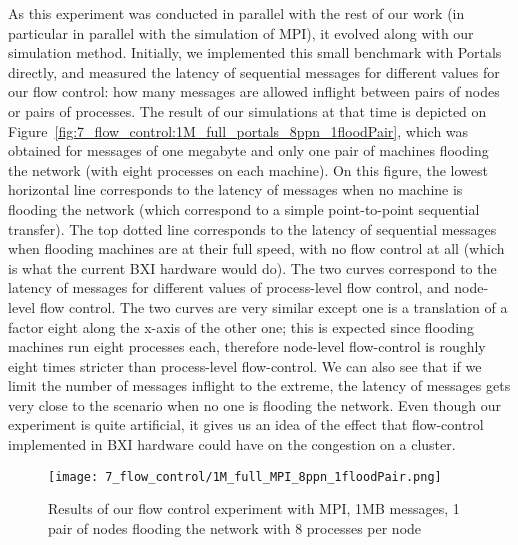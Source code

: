 As this experiment was conducted in parallel with the rest of our work (in
particular in parallel with the simulation of MPI), it evolved along with our
simulation method. Initially, we implemented this small benchmark with Portals
directly, and measured the latency of sequential messages for different values
for our flow control: how many messages are allowed inflight between pairs of
nodes or pairs of processes. The result of our simulations at that time is
depicted on Figure~\ref{fig:7_flow_control:1M_full_portals_8ppn_1floodPair},
which was obtained for messages of one megabyte and only one pair of machines
flooding the network (with eight processes on each machine). On this figure, the
lowest horizontal line corresponds to the latency of messages when no machine is
flooding the network (which correspond to a simple point-to-point sequential
transfer). The top dotted line corresponds to the latency of sequential messages
when flooding machines are at their full speed, with no flow control at all
(which is what the current BXI hardware would do). The two curves correspond to
the latency of messages for different values of process-level flow control, and
node-level flow control. The two curves are very similar except one is a
translation of a factor eight along the x-axis of the other one; this is
expected since flooding machines run eight processes each, therefore node-level
flow-control is roughly eight times stricter than process-level flow-control. We
can also see that if we limit the number of messages inflight to the extreme,
the latency of messages gets very close to the scenario when no one is flooding
the network. Even though our experiment is quite artificial, it gives us an idea
of the effect that flow-control implemented in BXI hardware could have on the
congestion on a cluster.

\begin{figure}[!ht]
    \centering
    \texttt{[image: 7\_flow\_control/1M\_full\_MPI\_8ppn\_1floodPair.png]}
    \caption{Results of our flow control experiment with MPI, 1MB messages, 1 pair of nodes flooding the network with 8 processes per node}
    \label{fig:7_flow_control:1M_full_MPI_8ppn_1floodPair}
\end{figure}


